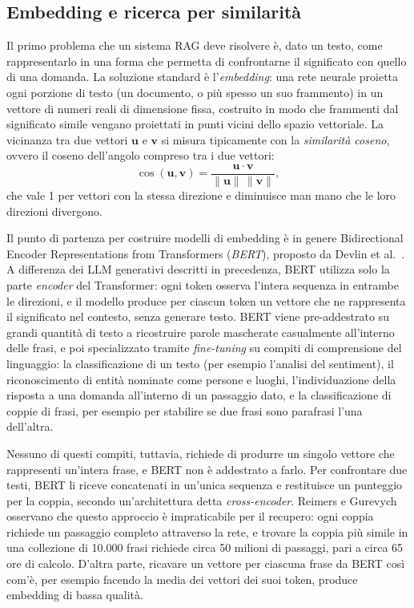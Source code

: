\subsection{Embedding e ricerca per similarità}\label{subsec:embedding}

Il primo problema che un sistema RAG deve risolvere è, dato un testo, come rappresentarlo in una forma che permetta
di confrontarne il significato con quello di una domanda. La soluzione standard è l'\emph{embedding}: una rete neurale
proietta ogni porzione di testo (un documento, o più spesso un suo frammento) in un vettore di numeri reali di
dimensione fissa, costruito in modo che frammenti dal significato simile vengano proiettati in punti vicini dello
spazio vettoriale. La vicinanza tra due vettori $\mathbf{u}$ e $\mathbf{v}$ si misura tipicamente con la
\emph{similarità coseno}, ovvero il coseno dell'angolo compreso tra i due vettori:
\begin{equation}
  \cos(\mathbf{u}, \mathbf{v}) = \frac{\mathbf{u} \cdot \mathbf{v}}{\lVert \mathbf{u} \rVert \, \lVert \mathbf{v} \rVert},
  \label{eq:coseno}
\end{equation}
che vale 1 per vettori con la stessa direzione e diminuisce man mano che le loro direzioni divergono.

Il punto di partenza per costruire modelli di embedding è in genere Bidirectional Encoder Representations
from Transformers (\emph{BERT}), proposto da Devlin et al.\ \cite{devlin2019bert}. A differenza dei LLM generativi descritti in precedenza, BERT utilizza solo la parte \emph{encoder} del Transformer: ogni token osserva
l'intera sequenza in entrambe le direzioni, e il modello produce per ciascun token un vettore che ne rappresenta il
significato nel contesto, senza generare testo. BERT viene pre-addestrato su grandi quantità di testo a ricostruire
parole mascherate casualmente all'interno delle frasi, e poi specializzato tramite \emph{fine-tuning} su compiti di
comprensione del linguaggio: la classificazione di un testo (per esempio l'analisi del sentiment), il riconoscimento
di entità nominate come persone e luoghi, l'individuazione della risposta a una domanda all'interno di un passaggio
dato, e la classificazione di coppie di frasi, per esempio per stabilire se due frasi sono parafrasi l'una dell'altra.

Nessuno di questi compiti, tuttavia, richiede di produrre un singolo vettore che rappresenti un'intera frase, e BERT
non è addestrato a farlo. Per confrontare due testi, BERT li riceve concatenati in un'unica sequenza e restituisce un
punteggio per la coppia, secondo un'architettura detta \emph{cross-encoder}. Reimers e Gurevych \cite{reimers2019sbert}
osservano che questo approccio è impraticabile per il recupero: ogni coppia richiede un passaggio completo attraverso
la rete, e trovare la coppia più simile in una collezione di 10.000 frasi richiede circa 50 milioni di passaggi, pari a
circa 65 ore di calcolo. D'altra parte, ricavare un vettore per ciascuna frase da BERT così com'è, per esempio facendo
la media dei vettori dei suoi token, produce embedding di bassa qualità.

